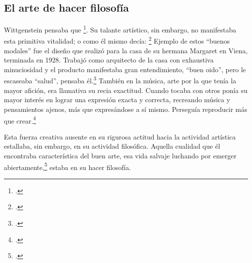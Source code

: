 \subsection{El arte de hacer filosofía}
  Wittgenstein pensaba que
  \footcite[p.~43e]{cnv}.
  Su talante artístico, sin embargo, no manifestaba esta primitiva vitalidad; o
  como él mismo decía:
  \footcite[p.~29e]{cnv}
  Ejemplo de estos ``buenos modales'' fue el diseño que realizó para la casa de su
  hermana Margaret en Viena, terminada en 1928.
  Trabajó como arquitecto de la casa con exhaustiva minuciosidad y el producto
  manifestaba gran entendimiento, ``buen oido'', pero le escaseaba ``salud'',
  pensaba él.\footcite[p.~43e]{cnv}
  También en la música, arte por la que tenía la mayor afición, era llamativa su
  recia exactitud. Cuando tocaba con otros ponía su mayor interés en lograr una
  expresión exacta y correcta, recreando música y pensamientos ajenos, más que
  expresándose a sí mismo. Perseguía reproducir más que
  crear.\footcite[loc.˜]{monk}

  Esta fuerza creativa ausente en su rigurosa actitud hacia la actividad artística
  estallaba, sin embargo, en su actividad filosófica. Aquella cualidad que él
  encontraba característica del buen arte, esa vida salvaje luchando por emerger
  abiertamente,\footcite[cf.˜][loc.˜]{monk} estaba en su hacer filosofía.


